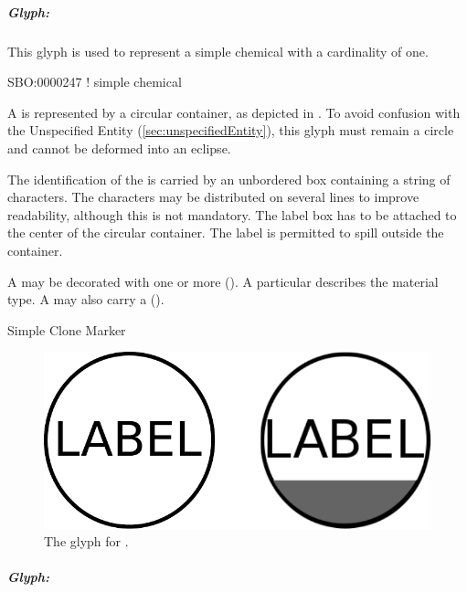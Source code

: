 \subparagraph{Glyph: }

This glyph is used to represent a simple chemical with a cardinality
of one.

\begin{glyphDescription}

\glyphSboTerm SBO:0000247 ! simple chemical

\glyphContainer A  is represented by a circular
container, as depicted in . To avoid confusion
with the Unspecified Entity (\ref{sec:unspecifiedEntity}), this glyph
must remain a circle and cannot be deformed into an eclipse.

\glyphLabel The identification of the  is carried by an unbordered box containing a string of characters.  The characters may be distributed on several lines to improve readability, although this is not mandatory.  The label box has to be attached to the center of the circular container.  The label is permitted to spill outside the container.

\glyphAux A  may be decorated with one or more  ().  A particular  describes the material type.  A  may also carry a  ().

\glyphCloning Simple Clone Marker

\end{glyphDescription}

\begin{figure}[H]
  \centering
  \includegraphics[scale = 0.3]{images/simpleChemical}
  \caption{The \PD glyph for .}
  \label{fig:simpleChemical}
\end{figure}

\subparagraph{Glyph: }

